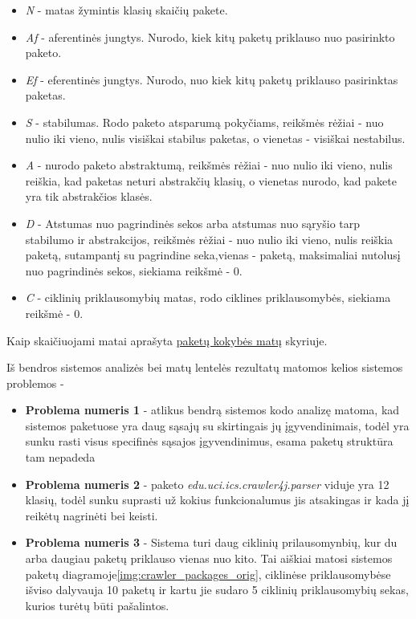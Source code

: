 \begin{itemize}
    \item \textit{N} - matas žymintis klasių skaičių pakete.
    \item \textit{Af} - aferentinės jungtys. Nurodo, kiek kitų paketų priklauso nuo pasirinkto paketo.
    \item \textit{Ef} - eferentinės jungtys. Nurodo, nuo kiek kitų paketų priklauso pasirinktas paketas.
    \item \textit{S} - stabilumas. Rodo paketo atsparumą pokyčiams, reikšmės rėžiai - nuo nulio iki vieno, nulis visiškai stabilus paketas, o vienetas - visiškai nestabilus.
    \item \textit{A} - nurodo paketo abstraktumą, reikšmės rėžiai - nuo nulio iki vieno, nulis reiškia, kad paketas neturi abstrakčių klasių, o vienetas nurodo, kad pakete yra tik abstrakčios klasės.
    \item \textit{D} - Atstumas nuo pagrindinės sekos arba atstumas nuo sąryšio tarp stabilumo ir abstrakcijos, reikšmės rėžiai - nuo nulio iki vieno, nulis reiškia paketą, sutampantį su pagrindine seka,vienas - paketą, maksimaliai nutolusį nuo pagrindinės sekos, siekiama reikšmė - 0.
    \item \textit{C} - ciklinių priklausomybių matas, rodo ciklines priklausomybės, siekiama reikšmė - 0.
\end{itemize}
Kaip skaičiuojami matai aprašyta \hyperref[sec:matai]{paketų kokybės matų} skyriuje.
\linebreak

Iš bendros sistemos analizės bei matų lentelės rezultatų matomos kelios sistemos problemos -
\begin{itemize}
    \item \textbf{Problema numeris 1} - atlikus bendrą sistemos kodo analizę matoma,
    kad sistemos paketuose yra daug sąsajų su skirtingais jų įgyvendinimais, todėl yra sunku
    rasti visus specifinės sąsajos įgyvendinimus, esama paketų struktūra tam nepadeda
    \item \textbf{Problema numeris 2} - paketo \textit{edu.uci.ics.crawler4j.parser} viduje yra 12 klasių, todėl sunku suprasti už kokius funkcionalumus jis atsakingas
    ir kada jį reikėtų nagrinėti bei keisti.
    \item \textbf{Problema numeris 3} - Sistema turi daug ciklinių prilausomynbių, kur du arba daugiau paketų priklauso vienas nuo kito.
    Tai aiškiai matosi sistemos paketų diagramoje\ref{img:crawler_packages_orig}, ciklinėse priklausomybėse išviso dalyvauja 10 paketų ir kartu jie sudaro 5 ciklinių priklausomybių sekas,
    kurios turėtų būti pašalintos.
\end{itemize}

